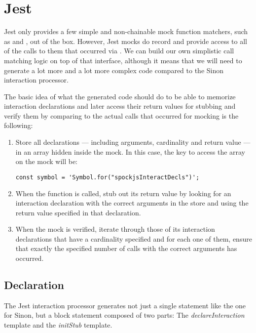 \section{Jest}
Jest only provides a few simple and non-chainable mock function matchers,
such as  and ,
out of the box.
However, Jest mocks do record and provide access to
all of the calls to them that occurred via
.
We can build our own simplistic call matching logic
on top of that interface,
although it means that we will need to
generate a lot more and a lot more complex code
compared to the Sinon interaction processor.

The basic idea of what the generated code should do
to be able to memorize interaction declarations
and later access their return values for stubbing
and verify them by comparing to the actual calls that occurred for mocking
is the following:
\begin{enumerate}
  \item Store all declarations
    --- including arguments, cardinality and return value ---
    in an array hidden inside the mock.
    In this case, the key to access the array on the mock will be:
    \begin{verbatim}
const symbol = 'Symbol.for("spockjsInteractDecls")';
    \end{verbatim}
  \item When the function is called,
    stub out its return value by
    looking for an interaction declaration
    with the correct arguments in the store
    and using the return value specified in that declaration.
  \item When the mock is verified,
    iterate through those of its interaction declarations
    that have a cardinality specified
    and for each one of them,
    ensure that exactly the specified number of calls
    with the correct arguments has occurred.
\end{enumerate}

\subsection{Declaration}
The Jest interaction processor generates
not just a single statement like the one for Sinon,
but a block statement composed of two parts:
The \textit{declareInteraction} template and
the \textit{initStub} template.

